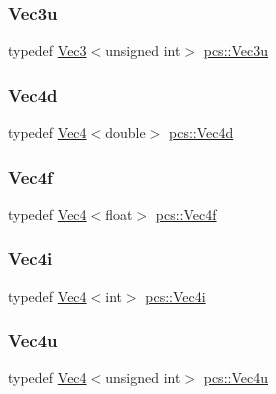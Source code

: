 \mbox{\label{namespacepcs_a2fb79528e302be33c240f71df13454ac}} 
\subsubsection{\texorpdfstring{Vec3u}{Vec3u}}
{\footnotesize\ttfamily typedef \hyperlink{structpcs_1_1Vec3}{Vec3}$<$unsigned int$>$ \hyperlink{namespacepcs_a2fb79528e302be33c240f71df13454ac}{pcs\+::\+Vec3u}}

\mbox{\label{namespacepcs_a16e5649fe0d83b923040c93b9895f9c9}} 
\subsubsection{\texorpdfstring{Vec4d}{Vec4d}}
{\footnotesize\ttfamily typedef \hyperlink{structpcs_1_1Vec4}{Vec4}$<$double$>$ \hyperlink{namespacepcs_a16e5649fe0d83b923040c93b9895f9c9}{pcs\+::\+Vec4d}}

\mbox{\label{namespacepcs_a826b4146f438aa3a4c6a5c157bc8dea2}} 
\subsubsection{\texorpdfstring{Vec4f}{Vec4f}}
{\footnotesize\ttfamily typedef \hyperlink{structpcs_1_1Vec4}{Vec4}$<$float$>$ \hyperlink{namespacepcs_a826b4146f438aa3a4c6a5c157bc8dea2}{pcs\+::\+Vec4f}}

\mbox{\label{namespacepcs_acc781a5c34ea403d128e3e500c74d9ad}} 
\subsubsection{\texorpdfstring{Vec4i}{Vec4i}}
{\footnotesize\ttfamily typedef \hyperlink{structpcs_1_1Vec4}{Vec4}$<$int$>$ \hyperlink{namespacepcs_acc781a5c34ea403d128e3e500c74d9ad}{pcs\+::\+Vec4i}}

\mbox{\label{namespacepcs_a4adb2d4806269c0560cf9dee9a4bbf86}} 
\subsubsection{\texorpdfstring{Vec4u}{Vec4u}}
{\footnotesize\ttfamily typedef \hyperlink{structpcs_1_1Vec4}{Vec4}$<$unsigned int$>$ \hyperlink{namespacepcs_a4adb2d4806269c0560cf9dee9a4bbf86}{pcs\+::\+Vec4u}}



